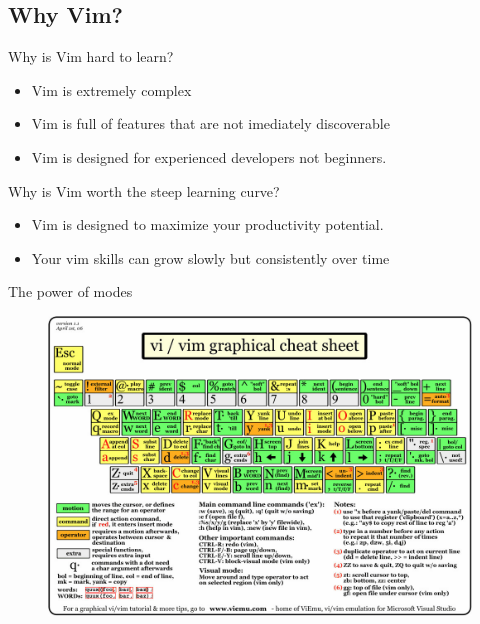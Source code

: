 \documentclass{beamer}
\begin{document}
    \subsection{Why Vim?}
    \begin{frame}{Why is Vim hard to learn?}
        \begin{itemize}
            \item <alert@+> Vim is extremely complex %
            \item <alert@+> Vim is full of features that are not imediately discoverable
            \item <alert@+> Vim is designed for experienced developers not beginners.
        \end{itemize}
    \end{frame}
    \begin{frame}{Why is Vim worth the steep learning curve?}
        \begin{itemize}
            \item <alert@+> Vim is designed to maximize your productivity potential.
            \item <alert@+> Your vim skills can grow slowly but consistently over time
        \end{itemize}
    \end{frame}
    \begin{frame}{The power of modes}
        \begin{figure}
            \centering
            \includegraphics[width=0.8\linewidth]{vi-vim-cheat-sheet.jpg}
        \end{figure}
    \end{frame}
\end{document}
